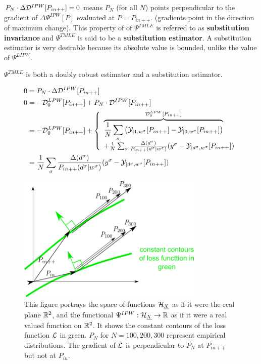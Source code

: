 $P_N\cdot \Delta{\cal D}^{IPW}[P_{in++}]=0$
means $P_N$ (for all $N$)
points perpendicular to the
gradient of $\Delta\Psi^{IPW}[P]$
evaluated at $P=P_{in++}$.
(gradients point in the direction
of maximum change).
This property of
of $\Psi^{TMLE}$ is referred to as {\bf substitution
invariance} and $\Psi^{TMLE}$
is said to be a {\bf substitution estimator}.
A substitution estimator is
very desirable because
its
absolute value is bounded, unlike
the value of $\Psi^{LIPW}$.

$\Psi^{TMLE}$ is both
a doubly robust estimator and a substitution estimator.

\begin{align}
0 &=
P_N\cdot\Delta{\cal D}^{IPW}[P_{in++}]
\\
0 &=-{\cal D}^{LPW}_0[P_{in++}]+
P_N\cdot{\cal D}^{IPW}[P_{in++}]
\\
&= -{\cal D}^{LPW}_0[P_{in++}]+
\left\{
\begin{array}{l}
\overbrace{
\frac{1}{N}
\sum_\sigma
\left(
{\cal Y}_{|1,w^\sigma}[P_{in++}]
-
{\cal Y}_{|0,w^\sigma}[P_{in++}]
\right)
}^{ {\cal D}^{LPW}_0[P_{in++}]}
\\
+
\frac{1}{N}
\sum_\sigma
\frac{\Delta(d^\sigma)}{P_{in++}(d^\sigma|w^\sigma)}
(y^\sigma-{\cal Y}_{|d^\sigma,w^\sigma}[P_{in++}])
\end{array}
\right.
\\
&=
\frac{1}{N}
\sum_\sigma
\frac{\Delta(d^\sigma)}{P_{in++}(d^\sigma|w^\sigma)}
(y^\sigma-{\cal Y}_{|d^\sigma,w^\sigma}[P_{in++}])
\end{align}


\begin{figure}[h!]
\centering
\includegraphics[width=3.5in]
{targeted-est/targeted-est.png}
\caption{
This figure portrays
the space of functions ${\cal H}_{\underline{X}}$
as if it were the real plane ${ \mathbb{R}}^2$,
and the functional $\Psi^{IPW}:{\cal H}_{\underline{X}}\rightarrow{ \mathbb{R}}$
as if it were a real valued function on ${ \mathbb{R}}^2$.
It shows  the constant contours
of the loss function ${\cal L}$ in green.
$P_N$ for $N=100, 200, 300$
represent empirical distributions.
The gradient of ${\cal L}$
is perpendicular to $P_N$  at $P_{in++}$
but not at $P_{in}$.
}
\label{fig-targeted-est}
\end{figure}

